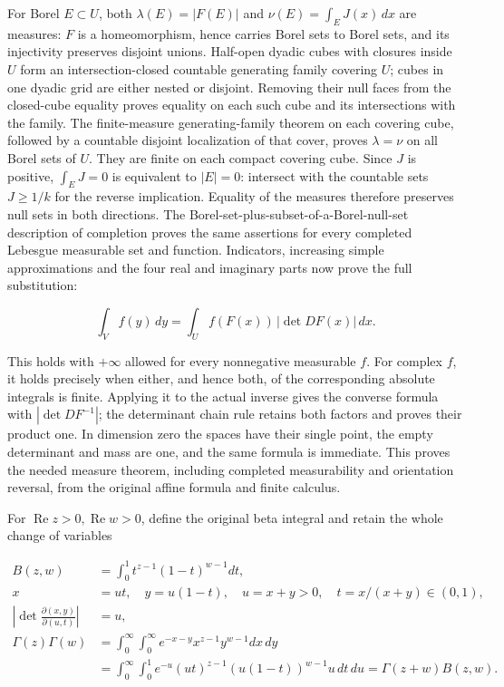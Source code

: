 \documentclass[
  11pt,
]{article}
\begin{document}
For Borel \(E\subset U\), both \(\lambda(E)=|F(E)|\) and
\(\nu(E)=\int_EJ(x)\,dx\) are measures: \(F\) is a homeomorphism, hence
carries Borel sets to Borel sets, and its injectivity preserves disjoint
unions. Half-open dyadic cubes with closures inside \(U\) form an
intersection-closed countable generating family covering \(U\); cubes in
one dyadic grid are either nested or disjoint. Removing their null faces
from the closed-cube equality proves equality on each such cube and its
intersections with the family. The finite-measure generating-family
theorem on each covering cube, followed by a countable disjoint
localization of that cover, proves \(\lambda=\nu\) on all Borel sets of
\(U\). They are finite on each compact covering cube. Since \(J\) is
positive, \(\int_EJ=0\) is equivalent to \(|E|=0\): intersect with the
countable sets \(J\geq1/k\) for the reverse implication. Equality of the
measures therefore preserves null sets in both directions. The
Borel-set-plus-subset-of-a-Borel-null-set description of completion
proves the same assertions for every completed Lebesgue measurable set
and function. Indicators, increasing simple approximations and the four
real and imaginary parts now prove the full substitution:

\[
\int_V f(y)\,dy
 =\int_U f(F(x))\,|\det DF(x)|\,dx.
\tag{CX35c}
\]

This holds with \(+\infty\) allowed for every nonnegative measurable
\(f\). For complex \(f\), it holds precisely when either, and hence
both, of the corresponding absolute integrals is finite. Applying it to
the actual inverse gives the converse formula with \(|\det DF^{-1}|\);
the determinant chain rule retains both factors and proves their product
one. In dimension zero the spaces have their single point, the empty
determinant and mass are one, and the same formula is immediate. This
proves the needed measure theorem, including completed measurability and
orientation reversal, from the original affine formula and finite
calculus.

For \(\operatorname{Re}z>0,\operatorname{Re}w>0\), define the original
beta integral and retain the whole change of variables

\[
\begin{aligned}
B(z,w)&=\int_0^1t^{z-1}(1-t)^{w-1}dt,\\
x&=ut,\quad y=u(1-t),\quad u=x+y>0,\quad t=x/(x+y)\in(0,1),\\
\left|\det\frac{\partial(x,y)}{\partial(u,t)}\right|&=u,\\
\Gamma(z)\Gamma(w)
 &=\int_0^\infty\int_0^\infty
            e^{-x-y}x^{z-1}y^{w-1}dx\,dy\\
 &=\int_0^\infty\int_0^1
   e^{-u}(ut)^{z-1}(u(1-t))^{w-1}u\,dt\,du
 =\Gamma(z+w)B(z,w).
\end{aligned}
\tag{CX36}
\]
\end{document}

